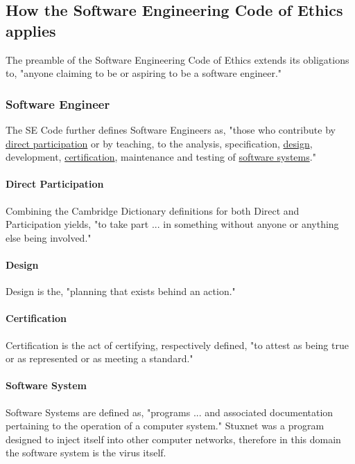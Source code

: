 \documentclass[12pt]{article}
\begin{document}
\begin{multicols}{2}
\subsection{How the Software Engineering Code of Ethics applies}

The preamble of the Software Engineering Code of Ethics extends its obligations to, "anyone claiming to be or aspiring to be a software engineer."\cite{softwareEngineeringCodeOfEthics}

\subsubsection{Software Engineer}

The SE Code further defines Software Engineers as, "those who contribute by \underline{direct participation} or by teaching, to the analysis, specification, \underline{design}, development, \underline{certification}, maintenance and testing of \underline{software systems}."

\paragraph{Direct Participation}

Combining the Cambridge Dictionary definitions for both Direct and Participation yields, "to take part ... in something without anyone or anything else being involved."\cite{participationDefinition}\cite{directDefinition}

\paragraph{Design}
Design is the, "planning that exists behind an action."\cite{designDefinition}

\paragraph{Certification}
Certification is the act of certifying, respectively defined, "to attest as being true or as represented or as meeting a standard."\cite{certifyingDefinition}

\paragraph{Software System}

Software Systems are defined as, "programs ... and associated documentation pertaining to the operation of a computer system."\cite{softwareSystemDefinition} Stuxnet was a program designed to inject itself into other computer networks, therefore in this domain the software system is the virus itself.\cite{w32.stuxnetDossier}


\end{multicols}
\end{document}
